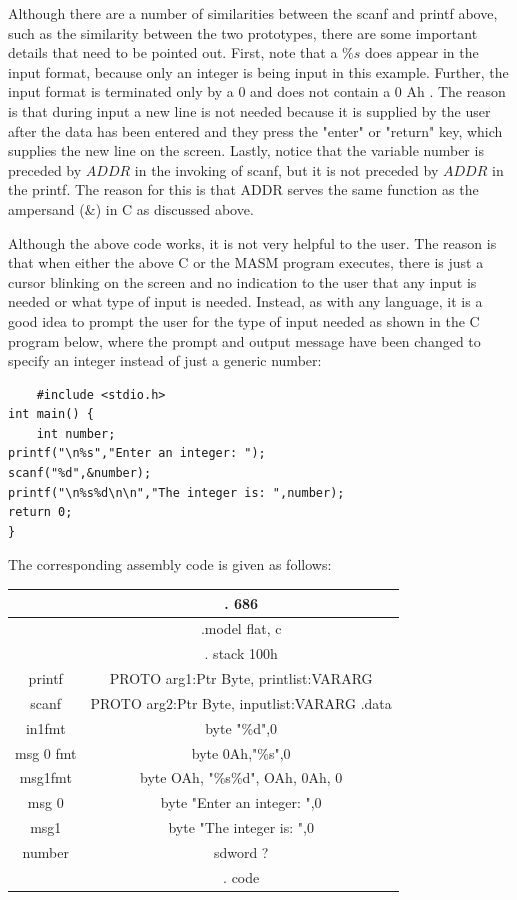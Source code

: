 \documentclass[10pt]{article}
\begin{document}
Although there are a number of similarities between the scanf and printf above, such as the similarity between the two prototypes, there are some important details that need to be pointed out. First, note that a $\% s$ does appear in the input format, because only an integer is being input in this example. Further, the input format is terminated only by a 0 and does not contain a 0 Ah . The reason is that during input a new line is not needed because it is supplied by the user after the data has been entered and they press the "enter" or "return" key, which supplies the new line on the screen. Lastly, notice that the variable number is preceded by $A D D R$ in the invoking of scanf, but it is not preceded by $A D D R$ in the printf. The reason for this is that ADDR serves the same function as the ampersand (\&) in C as discussed above.

Although the above code works, it is not very helpful to the user. The reason is that when either the above C or the MASM program executes, there is just a cursor blinking on the screen and no indication to the user that any input is needed or what type of input is needed. Instead, as with any language, it is a good idea to prompt the user for the type of input needed as shown in the C program below, where the prompt and output message have been changed to specify an integer instead of just a generic number:

\begin{verbatim}
    #include <stdio.h>
int main() {
    int number;
printf("\n%s","Enter an integer: ");
scanf("%d",&number);
printf("\n%s%d\n\n","The integer is: ",number);
return 0;
}
\end{verbatim}

The corresponding assembly code is given as follows:

\begin{center}
\begin{tabular}{|c|c|}
\hline
 & . 686 \\
\hline
 & .model flat, c \\
\hline
 & . stack 100h \\
\hline
printf & PROTO arg1:Ptr Byte, printlist:VARARG \\
\hline
scanf & PROTO arg2:Ptr Byte, inputlist:VARARG .data \\
\hline
in1fmt & byte "\%d",0 \\
\hline
msg 0 fmt & byte 0Ah,"\%s",0 \\
\hline
msg1fmt & byte OAh, "\%s\%d", OAh, 0Ah, 0 \\
\hline
msg 0 & byte "Enter an integer: ",0 \\
\hline
msg1 & byte "The integer is: ",0 \\
\hline
number & sdword ? \\
\hline
 & . code \\
\hline
\end{tabular}
\end{center}
\end{document}
